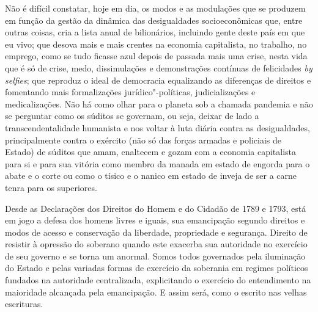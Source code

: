 Não é difícil constatar, hoje em dia, os modos e as modulações que se
produzem em função da gestão da dinâmica das desigualdades
socioeconômicas que, entre outras coisas, cria a lista anual de
bilionários, incluindo gente deste país em que eu vivo; que desova mais
e mais crentes na economia capitalista, no trabalho, no emprego, como se
tudo ficasse azul depois de passada mais uma crise, nesta vida que é só
de crise, medo, dissimulações e demonstrações contínuas de felicidades
\emph{by selfies}; que reproduz o ideal de democracia equalizando as
diferenças de direitos e fomentando mais formalizações
jurídico"-políticas, judicializações e medicalizações. Não há como olhar
para o planeta sob a chamada pandemia e não se perguntar como os súditos
se governam, ou seja, deixar de lado a transcendentalidade humanista e
nos voltar à luta diária contra as desigualdades, principalmente contra
o exército (não só das forças armadas e policiais de Estado) de súditos
que amam, enaltecem e gozam com a economia capitalista para si e para
sua vitória como membro da manada em estado de engorda para o abate e o
corte ou como o tísico e o nanico em estado de inveja de ser a carne
tenra para os superiores.

Desde as Declarações dos Direitos do Homem e do Cidadão de 1789 e 1793,
está em jogo a defesa dos homens livres e iguais, sua emancipação
segundo direitos e modos de acesso e conservação da liberdade,
propriedade e segurança. Direito de resistir à opressão do soberano
quando este exacerba sua autoridade no exercício de seu governo e se
torna um anormal. Somos todos governados pela iluminação do Estado e
pelas variadas formas de exercício da soberania em regimes políticos
fundados na autoridade centralizada, explicitando o exercício do
entendimento na maioridade alcançada pela emancipação. E assim será,
como o escrito nas velhas escrituras.

